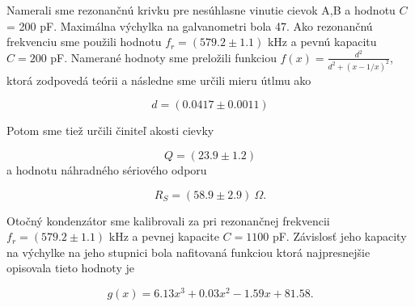 \documentclass{article}
\begin{document}
Namerali sme rezonančnú krivku pre nesúhlasne vinutie cievok A,B a hodnotu $C$ = 200 pF. Maximálna výchylka na galvanometri bola 47. Ako rezonančnú frekvenciu sme použili hodnotu $f_r = (579.2 \pm 1.1)$ kHz a pevnú kapacitu $C = 200$ pF. Namerané hodnoty sme preložili funkciou $f(x) = \frac{d^2}{d^2+(x-1/x)^2}$, ktorá zodpovedá teórii a následne sme určili mieru útlmu ako

$$d = (0.0417 \pm 0.0011)$$

Potom sme tiež určili činiteľ akosti cievky 

$$ Q = (23.9 \pm 1.2) $$
a hodnotu náhradného sériového odporu 

$$ R_S = (58.9\pm 2.9)\:\Omega.$$

Otočný kondenzátor sme kalibrovali za pri rezonančnej frekvencii $f_r = (579.2 \pm 1.1)$ kHz a pevnej kapacite $C = 1100$ pF. Závislosť jeho kapacity na výchylke na jeho stupnici bola nafitovaná funkciou ktorá najpresnejšie opisovala tieto hodnoty je 

$$g(x) = 6.13x^3 + 0.03x^2 - 1.59x + 81.58.$$

\printbibliography
\end{document}
